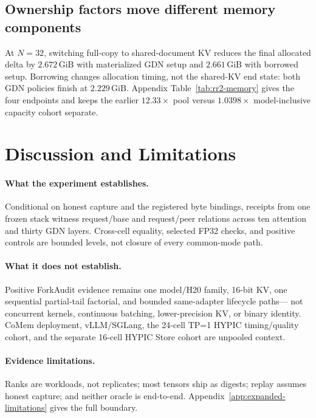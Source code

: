 \documentclass{article}
\newcommand{\gib}{\,\mathrm{GiB}}
\begin{document}
\subsection{Ownership factors move different memory components}

At $N=32$, switching full-copy to shared-document KV reduces the final allocated
delta by $2.672\gib$ with materialized GDN setup and $2.661\gib$ with borrowed
setup.  Borrowing changes allocation timing, not the shared-KV end state: both
GDN policies finish at $2.229\gib$.  Appendix Table~\ref{tab:rr2-memory} gives
the four endpoints and keeps the earlier $12.33\times$ pool versus
$1.0398\times$ model-inclusive capacity cohort separate.

\section{Discussion and Limitations}
\label{sec:limitations}

\paragraph{What the experiment establishes.}
Conditional on honest capture and the registered byte bindings, receipts from
one frozen stack witness request/base and request/peer relations across ten
attention and thirty GDN layers.  Cross-cell equality, selected FP32 checks,
and positive controls are bounded levels, not closure of every common-mode path.

\paragraph{What it does not establish.}
Positive ForkAudit evidence remains one model/H20 family, 16-bit KV, one
sequential partial-tail factorial, and bounded same-adapter lifecycle paths---
not concurrent kernels, continuous batching, lower-precision KV, or binary
identity.  CoMem deployment, vLLM/SGLang, the 24-cell TP=1 HYPIC timing/quality
cohort, and the separate 16-cell HYPIC Store cohort are unpooled context.

\paragraph{Evidence limitations.}
Ranks are workloads, not replicates; most tensors ship as digests; replay
assumes honest capture; and neither oracle is end-to-end.  Appendix~\ref{app:expanded-limitations}
gives the full boundary.
\end{document}
